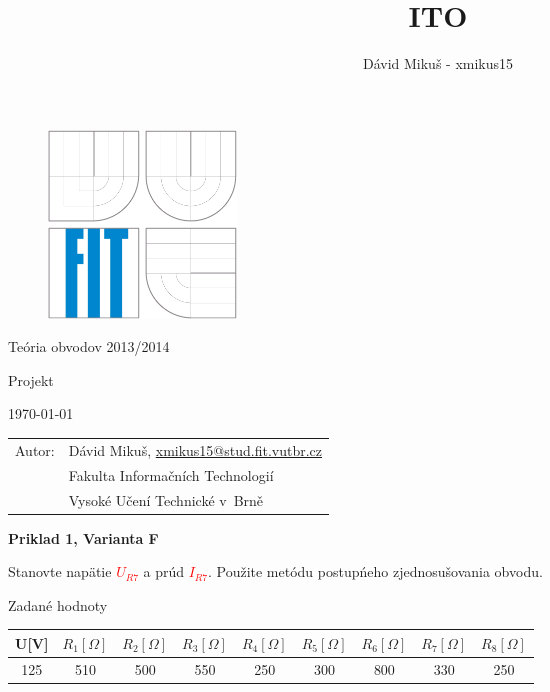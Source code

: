 \documentclass[a4paper,12pt]{article}
\author{Dávid Mikuš - xmikus15}
\title{ITO}
\begin{document}
\begin{figure}[!h]
  \centering
  \includegraphics[height=5cm]{img/logo}
\end{figure}

\begin{center}
\bigskip
\begin{Huge}
Teória obvodov 2013/2014\\
\end{Huge}
\begin{large}
Projekt
\end{large}
\end{center}

\begin{center}
\begin{Large}
\today
\end{Large}
\end{center}

\vfill

\begin{flushleft}
\begin{large}
\begin{tabular}{ll}
Autor: & Dávid Mikuš, \url{xmikus15@stud.fit.vutbr.cz} \\
 & Fakulta Informačních Technologií \\
 & Vysoké Učení Technické v~Brně \\
\end{tabular}
\end{large}
\end{flushleft}

\newpage
\begin{center}
\textbf{Priklad 1, Varianta F}
\end{center}
\bigskip
Stanovte napätie 
\textcolor{red}{$U_{R7}$}
a prúd
\textcolor{red}{$I_{R7}$}.
Použite metódu postupńeho zjednosušovania obvodu.
\bigskip

Zadané hodnoty

\begin{tabular} {|  c | c | c | c | c | c | c | c | c | }
\hline
U[V] & $R_1[\Omega]$ & $R_2[\Omega]$ & $R_3[\Omega]$ & $R_4[\Omega]$ & $R_5[\Omega]$ & $R_6[\Omega]$ & $R_7[\Omega]$ & $R_8[\Omega]$\\ \hline
125 & 510 & 500 & 550 & 250 & 300 & 800 & 330 & 250 \\ \hline
\end{tabular}
\bigskip
\end{document}
